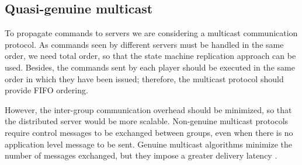 \documentclass[]{usiinfprospectus}
\begin{document}

%



\subsection{Quasi-genuine multicast} \label{sec:optmcast}

To propagate commands to servers we are considering a multicast communication protocol. 
As commands seen by different servers must be handled in the same order, we need total order, so that the state machine replication approach can be used. Besides, the commands sent by each player should be executed in the same order in which they have been issued; therefore, the multicast protocol should provide FIFO ordering.

However, the inter-group communication overhead should be minimized, so that the distributed server would be more scalable. Non-genuine multicast protocols \cite{schiper2009gng} require control messages to be exchanged between groups, even when there is no application level message to be sent. Genuine multicast algorithms minimize the number of messages exchanged, but they impose a greater delivery latency \cite{schiper2008ica}.
\end{document}
